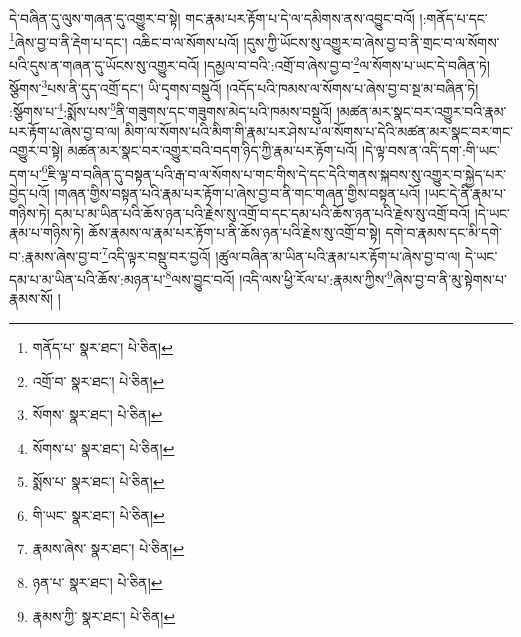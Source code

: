 དེ་བཞིན་དུ་ལུས་གཞན་དུ་འགྱུར་བ་སྟེ། གང་རྣམ་པར་རྟོག་པ་དེ་ལ་དམིགས་ནས་འབྱུང་བའོ། །:གནོད་པ་དང་\footnote{གནོད་པ་  སྣར་ཐང་།  པེ་ཅིན། }ཞེས་བྱ་བ་ནི་རྡེག་པ་དང་། འཆིང་བ་ལ་སོགས་པའོ། །དུས་ཀྱི་ཡོངས་སུ་འགྱུར་བ་ཞེས་བྱ་བ་ནི་གྲང་བ་ལ་སོགས་པའི་དུས་ན་གཞན་དུ་ཡོངས་སུ་འགྱུར་བའོ། །དམྱལ་བ་བའི་:འགྲོ་བ་ཞེས་བྱ་བ་\footnote{འགྲོ་བ་  སྣར་ཐང་།  པེ་ཅིན། }ལ་སོགས་པ་ཡང་དེ་བཞིན་ཏེ། སྩོགས་\footnote{སོགས་  སྣར་ཐང་།  པེ་ཅིན། }པས་ནི་དུད་འགྲོ་དང་། ཡི་དྭགས་བསྡུའོ། །འདོད་པའི་ཁམས་ལ་སོགས་པ་ཞེས་བྱ་བ་སྔ་མ་བཞིན་ཏེ། :སྩོགས་པ་\footnote{སོགས་པ་  སྣར་ཐང་།  པེ་ཅིན། }:སྨོས་པས་\footnote{སྨོས་པ་  སྣར་ཐང་།  པེ་ཅིན། }ནི་གཟུགས་དང་གཟུགས་མེད་པའི་ཁམས་བསྡུའོ། །མཚན་མར་སྣང་བར་འགྱུར་བའི་རྣམ་པར་རྟོག་པ་ཞེས་བྱ་བ་ལ། མིག་ལ་སོགས་པའི་མིག་གི་རྣམ་པར་ཤེས་པ་ལ་སོགས་པ་དེའི་མཚན་མར་སྣང་བར་གང་འགྱུར་བ་སྟེ། མཚན་མར་སྣང་བར་འགྱུར་བའི་བདག་ཉིད་ཀྱི་རྣམ་པར་རྟོག་པའོ། །དེ་ལྟ་བས་ན་འདི་དག་:གི་ཡང་དག་པ་\footnote{གི་ཡང་  སྣར་ཐང་།  པེ་ཅིན། }ཇི་ལྟ་བ་བཞིན་དུ་བསྟན་པའི་རྒ་བ་ལ་སོགས་པ་གང་གིས་དེ་དང་དེའི་གནས་སྐབས་སུ་འགྱུར་བ་སྐྱེད་པར་བྱེད་པའོ། །གཞན་གྱིས་བསྟན་པའི་རྣམ་པར་རྟོག་པ་ཞེས་བྱ་བ་ནི་གང་གཞན་གྱིས་བསྟན་པའོ། །ཡང་དེ་ནི་རྣམ་པ་གཉིས་ཏེ། དམ་པ་མ་ཡིན་པའི་ཆོས་ཉན་པའི་རྗེས་སུ་འགྲོ་བ་དང་དམ་པའི་ཆོས་ཉན་པའི་རྗེས་སུ་འགྲོ་བའོ། །དེ་ཡང་རྣམ་པ་གཉིས་ཏེ། ཆོས་རྣམས་ལ་རྣམ་པར་རྟོག་པ་ནི་ཆོས་ཉན་པའི་རྗེས་སུ་འགྲོ་བ་སྟེ། དགེ་བ་རྣམས་དང་མི་དགེ་བ་:རྣམས་ཞེས་བྱ་བ་\footnote{རྣམས་ཞེས་  སྣར་ཐང་།  པེ་ཅིན། }འདི་ལྟར་བསྡུ་བར་བྱའོ། །ཚུལ་བཞིན་མ་ཡིན་པའི་རྣམ་པར་རྟོག་པ་ཞེས་བྱ་བ་ལ། དེ་ཡང་དམ་པ་མ་ཡིན་པའི་ཆོས་:མཉན་པ་\footnote{ཉན་པ་  སྣར་ཐང་།  པེ་ཅིན། }ལས་བྱུང་བའོ། །འདི་ལས་ཕྱི་རོལ་པ་:རྣམས་ཀྱིས་\footnote{རྣམས་ཀྱི་  སྣར་ཐང་།  པེ་ཅིན། }ཞེས་བྱ་བ་ནི་མུ་སྟེགས་པ་རྣམས་སོ། །
